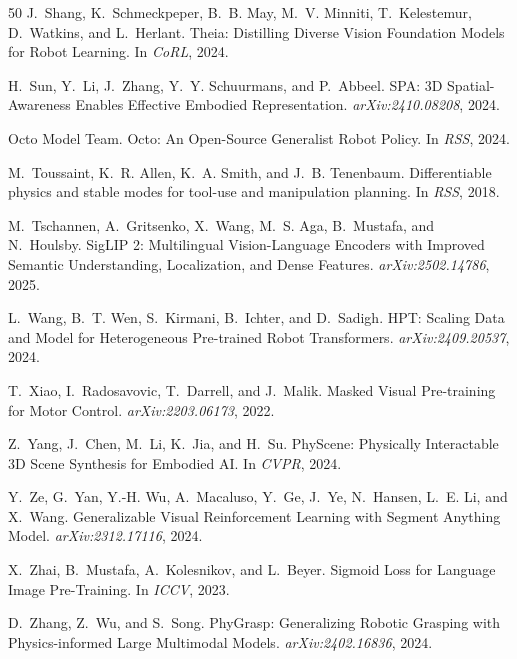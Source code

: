 \documentclass{article}
\begin{document}
{\begin{thebibliography}{50}
J.~Shang, K.~Schmeckpeper, B.~B. May, M.~V. Minniti, T.~Kelestemur, D.~Watkins, and L.~Herlant.
\newblock Theia: Distilling Diverse Vision Foundation Models for Robot Learning.
\newblock In \emph{CoRL}, 2024.

H.~Sun, Y.~Li, J.~Zhang, Y.~Y. Schuurmans, and P.~Abbeel.
\newblock SPA: 3D Spatial-Awareness Enables Effective Embodied Representation.
\newblock \emph{arXiv:2410.08208}, 2024.

Octo Model Team.
\newblock Octo: An Open-Source Generalist Robot Policy.
\newblock In \emph{RSS}, 2024.

M.~Toussaint, K.~R. Allen, K.~A. Smith, and J.~B. Tenenbaum.
\newblock Differentiable physics and stable modes for tool-use and manipulation planning.
\newblock In \emph{RSS}, 2018.

M.~Tschannen, A.~Gritsenko, X.~Wang, M.~S. Aga, B.~Mustafa, and N.~Houlsby.
\newblock SigLIP 2: Multilingual Vision-Language Encoders with Improved Semantic Understanding, Localization, and Dense Features.
\newblock \emph{arXiv:2502.14786}, 2025.

L.~Wang, B.~T. Wen, S.~Kirmani, B.~Ichter, and D.~Sadigh.
\newblock HPT: Scaling Data and Model for Heterogeneous Pre-trained Robot Transformers.
\newblock \emph{arXiv:2409.20537}, 2024.

T.~Xiao, I.~Radosavovic, T.~Darrell, and J.~Malik.
\newblock Masked Visual Pre-training for Motor Control.
\newblock \emph{arXiv:2203.06173}, 2022.

Z.~Yang, J.~Chen, M.~Li, K.~Jia, and H.~Su.
\newblock PhyScene: Physically Interactable 3D Scene Synthesis for Embodied AI.
\newblock In \emph{CVPR}, 2024.

Y.~Ze, G.~Yan, Y.-H. Wu, A.~Macaluso, Y.~Ge, J.~Ye, N.~Hansen, L.~E. Li, and X.~Wang.
\newblock Generalizable Visual Reinforcement Learning with Segment Anything Model.
\newblock \emph{arXiv:2312.17116}, 2024.

X.~Zhai, B.~Mustafa, A.~Kolesnikov, and L.~Beyer.
\newblock Sigmoid Loss for Language Image Pre-Training.
\newblock In \emph{ICCV}, 2023.

D.~Zhang, Z.~Wu, and S.~Song.
\newblock PhyGrasp: Generalizing Robotic Grasping with Physics-informed Large Multimodal Models.
\newblock \emph{arXiv:2402.16836}, 2024.


\end{thebibliography}}
\end{document}
